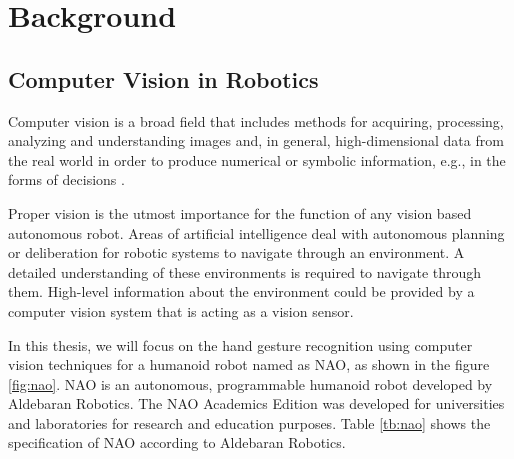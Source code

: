 \chapter{Background}

\section{Computer Vision in Robotics} 
Computer vision is a broad field that includes methods for acquiring, processing, analyzing and understanding images and, in general, high-dimensional data from the real world in order to produce numerical or symbolic information, e.g., in the forms of decisions \cite{1}.

Proper vision is the utmost importance for the function of any vision based autonomous robot. Areas of artificial intelligence deal with autonomous planning or deliberation for robotic systems to navigate through an environment. A detailed understanding of these environments is required to navigate through them. High-level information about the environment could be provided by a computer vision system that is acting as a vision sensor.

In this thesis, we will focus on the hand gesture recognition using computer vision techniques for a humanoid robot named as NAO, as shown in the figure \ref{fig:nao}. NAO is an autonomous, programmable humanoid robot developed by Aldebaran Robotics. The NAO Academics Edition was developed for universities and laboratories for research and education purposes. Table \ref{tb:nao} shows the specification of NAO according to Aldebaran Robotics.



